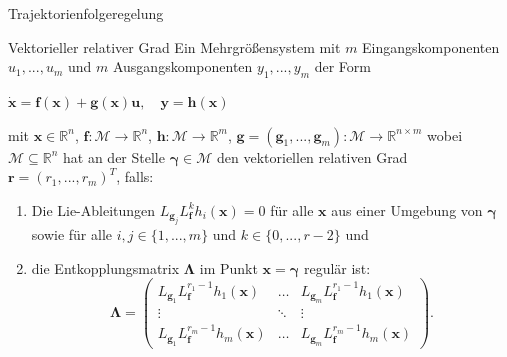 \documentclass[
	ngerman,
	10pt,				%
	aspectratio=169 	%
]{beamer}
\begin{document}
\begin{frame}[t,fragile,label=trajektorienregelung_2]{\large Trajektorienfolgeregelung}
   	
   	\begin{block}{Vektorieller relativer Grad}
	Ein Mehrgrößensystem mit $m$ Eingangskomponenten $u_1, ..., u_m$ und $m$ Ausgangskomponenten $y_1, ..., y_m$ der Form \\
	\begin{centering}
		$\dot{\mathbf{x}} = \mathbf{f}(\mathbf{x}) + \mathbf{g}(\mathbf{x}) \mathbf{u}, \quad \mathbf{y} = \mathbf{h}(\mathbf{x})$ \\
	\end{centering}
	\pause
	mit $\mathbf{x} \in \mathbb{R}^n$, $\mathbf{f}: \mathcal{M} \rightarrow \mathbb{R}^n$, ${\mathbf{h}: \mathcal{M} \rightarrow \mathbb{R}^m}$, $\mathbf{g} = (\mathbf{g}_1, ..., \mathbf{g}_m): \mathcal{M} \rightarrow \mathbb{R}^{n \times m}$ wobei $\mathcal{M} \subseteq \mathbb{R}^{n}$ hat an der Stelle $\boldsymbol{\gamma} \in \mathcal{M}$ den vektoriellen relativen Grad $\mathbf{r} = (r_1, ..., r_m)^T$, falls:
	\begin{enumerate}
		\pause
		\item Die Lie-Ableitungen $L_{\mathbf{g}_j} L_{\mathbf{f}}^k h_i(\mathbf{x}) = 0$ für alle $\mathbf{x}$ aus einer Umgebung von $\boldsymbol{\gamma}$ sowie für alle $i,j \in \{1, ..., m\}$ und $k \in \{0, ..., r-2\}$ und
		\pause
		\item die Entkopplungsmatrix $\boldsymbol{\Lambda}$ im Punkt $\mathbf{x} = \boldsymbol{\gamma}$ regulär ist:
		\begin{equation*}
			\label{eq:decoupling_matrix}
			\boldsymbol{\Lambda} = 
			\left(\begin{smallmatrix}
				L_{\mathbf{g}_1} L_{\mathbf{f}}^{r_1 -1} h_1(\mathbf{x}) & \hdots & L_{\mathbf{g}_m} L_{\mathbf{f}}^{r_1 -1} h_1(\mathbf{x}) \\
				\vdots & \ddots & \vdots \\
				L_{\mathbf{g}_1} L_{\mathbf{f}}^{r_m -1} h_m(\mathbf{x}) & \hdots & L_{\mathbf{g}_m} L_{\mathbf{f}}^{r_m -1} h_m(\mathbf{x})
			\end{smallmatrix}\right) .
		\end{equation*}
	\end{enumerate}
	\end{block}
	
\end{frame}

\end{document}
